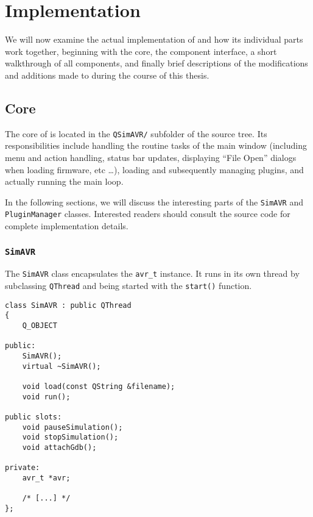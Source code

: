 
\chapter{Implementation} \label{chapter:implementation}

We will now examine the actual implementation of \qsimavr and how its individual
parts work together, beginning with the core, the component interface,
a short walkthrough of all components, and finally brief descriptions of the
modifications and additions made to \simavr during the course of this thesis.


\section{\qsimavr Core} \label{section:core}

The core of \qsimavr is located in the \verb|QSimAVR/| subfolder of the source
tree. Its responsibilities include handling the routine tasks of the main window
(including menu and action handling, status bar updates, displaying ``File Open''
dialogs when loading firmware, etc \ldots), loading and subsequently managing
plugins, and actually running the \simavr main loop.

In the following sections, we will discuss the interesting parts of the
\lstinline|SimAVR| and \lstinline|PluginManager| classes. Interested readers
should consult the source code for complete implementation details.


\subsection{\lstinline|SimAVR|} \label{subsection:class_simavr}

The \lstinline|SimAVR| class encapsulates the \lstinline|avr_t| instance. It
runs in its own thread by subclassing \lstinline|QThread| and being started
with the \lstinline|start()| function.

\begin{lstlisting}
class SimAVR : public QThread
{
    Q_OBJECT

public:
    SimAVR();
    virtual ~SimAVR();

    void load(const QString &filename);
    void run();

public slots:
    void pauseSimulation();
    void stopSimulation();
    void attachGdb();

private:
    avr_t *avr;

    /* [...] */
};
\end{lstlisting}

